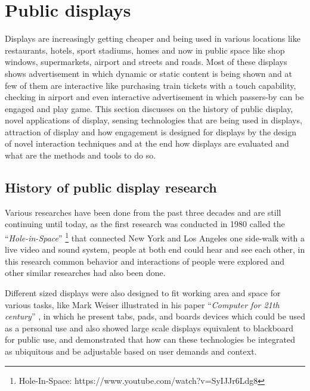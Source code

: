 \section{Public displays}
Displays are increasingly getting cheaper and being used in various locations like restaurants, hotels, sport stadiums, homes and now in public space like shop windows, supermarkets, airport and streets and roads. Most of these displays shows advertisement in which dynamic or static content is being shown and at few of them are interactive like purchasing train tickets with a touch capability, checking in airport and even interactive advertisement in which passers-by can be engaged and play game. 
This section discusses on the history of public display, novel applications of display, sensing technologies that are being used in displays, attraction of display and how engagement is designed for displays by the design of novel interaction techniques and at the end how displays are evaluated and what are the methods and tools to do so.




\subsection{History of public display research}
Various researches have been done from the past three decades and are still continuing until today, as the first research was conducted in 1980 called the ``\emph{Hole-in-Space}'' \footnote{Hole-In-Space: https://www.youtube.com/watch?v=SyIJJr6Ldg8} that connected New York and Los Angeles one side-walk with a live video and sound system, people at both end could hear and see each other, in this research common behavior and interactions of people were explored and other similar researches had also been done.

Different sized displays were also designed to fit working area and space for various tasks, like Mark Weiser illustrated in his paper ``\emph{Computer for 21th century}'' \cite{newgenerationcomputer}, in which he present tabs, pads, and boards devices which could be used as a personal use and also showed large scale displays equivalent to blackboard for public use, and demonstrated that how can these technologies be integrated as ubiquitous and be adjustable based on user demands and context. 

